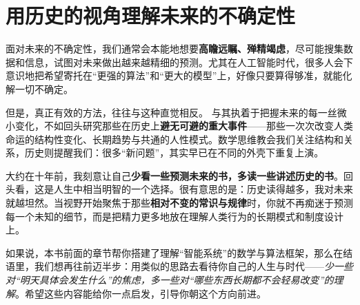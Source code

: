 \section*{用历史的视角理解未来的不确定性}

面对未来的不确定性，我们通常会本能地想要\textbf{高瞻远瞩、殚精竭虑}，尽可能搜集数据和信息，试图对未来做出越来越精细的预测。尤其在人工智能时代，很多人会下意识地把希望寄托在“更强的算法”和“更大的模型”上，好像只要算得够准，就能化解一切不确定。

但是，真正有效的方法，往往与这种直觉相反。  
与其执着于把握未来的每一丝微小变化，不如回头研究那些在历史上\textbf{避无可避的重大事件}——那些一次次改变人类命运的结构性变化、长期趋势与共通的人性模式。数学思维教会我们关注结构和关系，历史则提醒我们：很多“新问题”，其实早已在不同的外壳下重复上演。

大约在十年前，我刻意让自己\textbf{少看一些预测未来的书，多读一些讲述历史的书}。回头看，这是人生中相当明智的一个选择。很有意思的是：历史读得越多，我对未来就越坦然。当视野开始聚焦于那些\textbf{相对不变的常识与规律}时，你就不再痴迷于预测每一个未知的细节，而是把精力更多地放在理解人类行为的长期模式和制度设计上。

如果说，本书前面的章节帮你搭建了理解“智能系统”的数学与算法框架，那么在结语里，我们想再往前迈半步：用类似的思路去看待你自己的人生与时代——\textit{少一些对“明天具体会发生什么”的焦虑，多一些对“哪些东西长期都不会轻易改变”的理解}。希望这些内容能给你一点启发，引导你朝这个方向前进。


